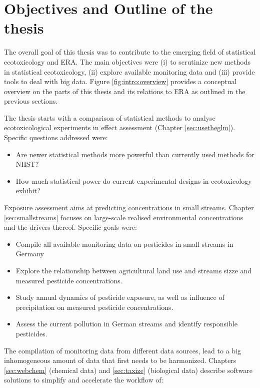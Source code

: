 \section{Objectives and Outline of the thesis}

The overall goal of this thesis was to contribute to the emerging field of statistical ecotoxicology and ERA.
The main objectives were (i) to scrutinize new methods in statistical ecotoxicology,
(ii) explore available monitoring data and
(iii) provide tools to deal with big data.
Figure \ref{fig:intro:overview} provides a conceptual overview on the parts of this thesis and its relations to ERA as outlined in the previous sections.

\noindent The thesis starts with a comparison of statistical methods to analyse ecotoxicological experiments in effect assessment (Chapter \ref{sec:usetheglm}). 
Specific questions addressed were:

\begin{itemize}
	\item Are newer statistical methods more powerful than currently used methods for NHST?
	\item How much statistical power do current experimental designs in ecotoxicology exhibit?
\end{itemize}


\noindent Exposure assessment aims at predicting concentrations in small streams. 
Chapter \ref{sec:smallstreams} focuses on large-scale realised environmental concentrations and the drivers thereof. 
Specific goals were:
\begin{itemize}
	\item Compile all available monitoring data on pesticides in small streams in Germany
	\item Explore the relationship between agricultural land use and streams sizze and measured pesticide concentrations.
	\item Study annual dynamics of pesticide exposure, as well as influence of precipitation on measured pesticide concentrations.
	\item Assess the current pollution in German streams and identify responsible pesticides.
\end{itemize}

\noindent
The compilation of monitoring data from different data sources, lead to a big inhomogeneous amount of data that first needs to be harmonized.
Chapters \ref{sec:webchem} (chemical data) and \ref{sec:taxize} (biological data) describe software solutions to simplify and accelerate the workflow of:

